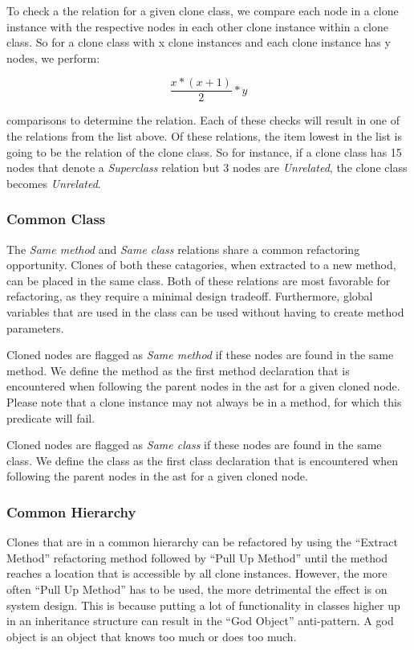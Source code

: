 To check a the relation for a given clone class, we compare each node in a clone instance with the respective nodes in each other clone instance within a clone class. So for a clone class with x clone instances and each clone instance has y nodes, we perform:

\begin{equation}\label{eq:sameclass}
\frac{x * (x + 1)}{2} * y
\end{equation}

comparisons to determine the relation. Each of these checks will result in one of the relations from the list above. Of these relations, the item lowest in the list is going to be the relation of the clone class. So for instance, if a clone class has 15 nodes that denote a \textit{Superclass} relation but 3 nodes are \textit{Unrelated}, the clone class becomes \textit{Unrelated}.

\subsubsection{Common Class}
The \textit{Same method} and \textit{Same class} relations share a common refactoring opportunity. Clones of both these catagories, when extracted to a new method, can be placed in the same class. Both of these relations are most favorable for refactoring, as they require a minimal design tradeoff. Furthermore, global variables that are used in the class can be used without having to create method parameters.

Cloned nodes are flagged as \textit{Same method} if these nodes are found in the same method. We define the method as the first method declaration that is encountered when following the parent nodes in the ast for a given cloned node. Please note that a clone instance may not always be in a method, for which this predicate will fail.

Cloned nodes are flagged as \textit{Same class} if these nodes are found in the same class. We define the class as the first class declaration that is encountered when following the parent nodes in the ast for a given cloned node.

\subsubsection{Common Hierarchy}
Clones that are in a common hierarchy can be refactored by using the ``Extract Method'' refactoring method followed by ``Pull Up Method'' until the method reaches a location that is accessible by all clone instances. However, the more often ``Pull Up Method'' has to be used, the more detrimental the effect is on system design. This is because putting a lot of functionality in classes higher up in an inheritance structure can result in the ``God Object'' anti-pattern. A god object is an object that knows too much or does too much.

